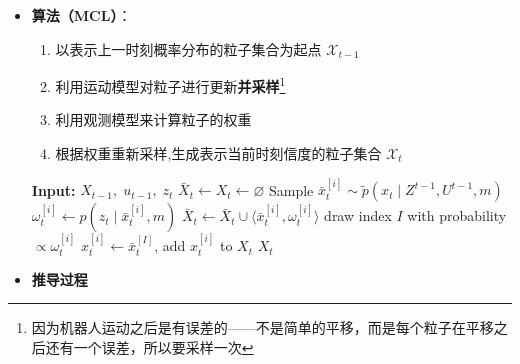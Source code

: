 \documentclass[../main.tex]{subfiles}
\begin{document}
\begin{enumerate}
\begin{itemize}
\begin{itemize}
                \item \textbf{粒子滤波实际上是计算所有状态序列的后验概率}
            \end{itemize}
            \item \textbf{算法（MCL）}：
                \begin{enumerate}
                    \item 以表示上一时刻概率分布的粒子集合为起点 \( {\mathcal{X}}_{t - 1} \)
                    \item 利用运动模型对粒子进行更新\textbf{并采样}\footnote{因为机器人运动之后是有误差的——不是简单的平移，而是每个粒子在平移之后还有一个误差，所以要采样一次}
                    \item 利用观测模型来计算粒子的权重
                    \item 根据权重重新采样,生成表示当前时刻信度的粒子集合 \( {\mathcal{X}}_{t} \)
                \end{enumerate}
                \begin{algorithm}[H]
                \caption{Particle filter}
                \label{alg:particle_filter}
                \begin{algorithmic}[1]
                \State \textbf{Input:} $X_{t-1},\; u_{t-1},\; z_t$
                \State $\bar{X}_t \gets X_t \gets \varnothing$
                  \State Sample $\bar{x}_t^{[i]} \sim \tilde{p}(x_t \mid Z^{t-1}, U^{t-1}, m)$
                  \State $\omega_t^{[i]} \gets p(z_t \mid \bar{x}_t^{[i]}, m)$
                  \State $\bar{X}_t \gets \bar{X}_t \cup \langle \bar{x}_t^{[i]}, \omega_t^{[i]} \rangle$
                \EndFor
                \footnotemark
                  \State draw index $I$ with probability $\propto \omega_t^{[i]}$
                  \State $x_t^{[i]} \gets \bar{x}_t^{[I]}$, add $x_t^{[i]}$ to $X_t$
                \EndFor
                \State \Return $X_t$
                \end{algorithmic}
                \end{algorithm}
            \item \textbf{推导过程}\\
            {\small{}}
\end{itemize}
\end{enumerate}
\end{document}
